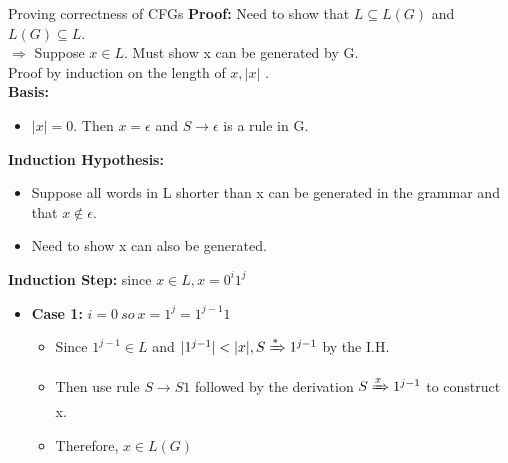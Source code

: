 \documentclass{beamer}
\begin{document}
\begin{frame}{Proving correctness of CFGs}
	\textbf{Proof: }Need to show that $L \subseteq L(G)$ and $L(G) \subseteq L.$\\
	$\Rightarrow$ Suppose $x \in L$. Must show x can be generated by G.\\
	Proof by induction on the length of $x, \big|x\big|$ .\\
	\textbf{Basis:}
	\begin{itemize}
		\item  $|x| = 0.$ Then $x = \epsilon$ and $S \rightarrow \epsilon$ is a rule in G.
	\end{itemize}
\textbf{Induction Hypothesis:}
\begin{itemize}
	\item Suppose all words in L shorter than x can be generated in the grammar 
	and that $x \notin \epsilon$.
	\item Need to show x can also be generated.
	 
\end{itemize}
\textbf{Induction Step:}  since $x \in L, x = 0^i1^j$
\begin{itemize}
	\item \textbf{Case 1:} $i = 0\  so\  x = 1^j= 1^{j-1}1 $
	\begin{itemize}
			\item Since $1^{j-1} \in L$ and $|1^{j-1}| < |x|, S\xRightarrow{*} 1^{j-1}$ by the I.H.
			\item Then use rule $S \rightarrow S1$ followed by the derivation $S \xRightarrow{x} 1^{j-1}$ to construct x.
			\item Therefore, $x \in L(G)$
	\end{itemize}

	
\end{itemize}

\end{frame}
\end{document}
